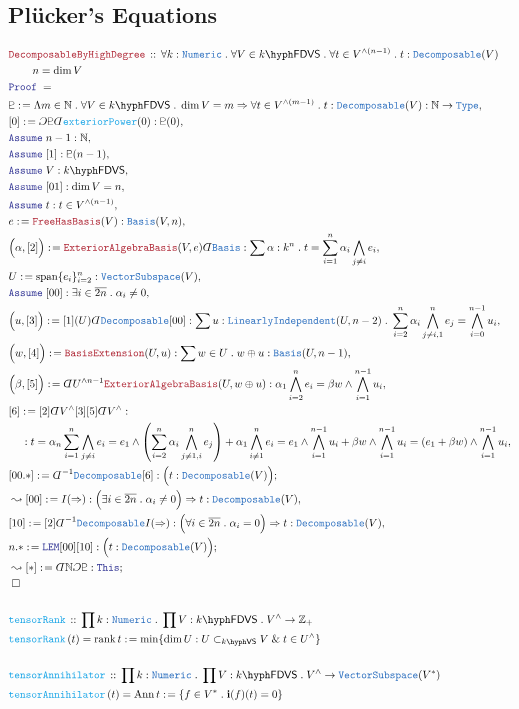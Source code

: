 \documentclass[12pt]{scrartcl}%
\newcommand{\TYPE}[1]{\textcolor{NavyBlue}{\mathtt{#1}}}%
\newcommand{\FUNC}[1]{\textcolor{Cerulean}{\mathtt{#1}}}%
\newcommand{\LOGIC}[1]{\textcolor{Blue}{\mathtt{#1}}}%
\newcommand{\THM}[1]{\textcolor{Maroon}{\mathtt{#1}}}%
\renewcommand{\.}{\; . \;} %
\newcommand{\de}{: \kern 0.1pc =} %
\newcommand{\Act}[1]{\left( #1 \right)} %
\newcommand{\Theorem}[2]{& \THM{#1} \, :: \, #2 \\ & \Proof = \\ } %
\newcommand{\DeclareFunc}[2]{& \FUNC{#1} \, :: \, #2 \\}%
\newcommand{\DefineNamedFunc}[4]{&  \FUNC{#1}\Act{#2} = #3 \de #4 \\}%
\newcommand{\NewLine}{\\ & \kern 1pc}%
\newcommand{\Page}[1]{ \begin{align*} #1 \end{align*}  }%
\newcommand{ \bd }{ \ByDef }%
\renewcommand{\And}{\; \& \;}%
\newcommand{\Type}{\TYPE{Type}}%
\newcommand{\Int}{\mathbb{Z}}%
\newcommand{\Nat}{\mathbb{N}}%
\newcommand{\Imply}{\Rightarrow}
\newcommand{\Say}[3]{& #1 \de #2 : #3, \\} %
\newcommand{\Conclude}[3]{& #1 \de #2 : #3; \\}%
\newcommand{\Derive}[3]{& \leadsto #1 \de #2 : #3, \\} %
\newcommand{\DeriveConclude}[3]{& \leadsto #1 \de #2 : #3 ; \\} %
\newcommand{\Assume}[2]{& \LOGIC{Assume} \; #1 : #2, \\} %
\newcommand{\QED}{\; \square} %
\newcommand{\EndProof}{& \QED \\} %
\newcommand{\ByDef}{\rotatebox[origin=c]{-180}{$D$}}%
\newcommand{\ByConstr}{\rotatebox[origin=c]{-180}{$C$}}%
\newcommand{\Proof}{\LOGIC{Proof} \; } %
\DeclareMathOperator{\rank}{rank} %
\newcommand{\Basis}{\TYPE{Basis}} %
\newcommand{\subvec}[1]{\subset_{\VS{#1}}}%
\newcommand{\LI}{\TYPE{LinearlyIndependent}}
\DeclareMathOperator{\Span}{span} %
\DeclareMathOperator{\Ann}{Ann}   %
\newcommand{\VS}[1]{#1\hyph\mathsf{VS}} %
\newcommand{\FDVS}[1]{#1\hyph\mathsf{FDVS}} %
\begin{document}
\subsection{Pl{\"u}cker's Equations}
\Page{
	\Theorem{DecomposableByHighDegree}
	{
		\forall k : \TYPE{Numeric} \.
		\forall V \in \FDVS{k} \.
		\forall t \in V^{\wedge(n-1)} \.
		t : \TYPE{Decomposable}(V)
		\NewLine
		\quad n = \dim V
	}
	\Say{\pluto}
	{
		\Lambda m \in \Nat \. 
		\forall V \in \FDVS{k} \.
		\dim V = m \Imply
		\forall t \in V^{\wedge(m-1)} \.
		t : \TYPE{Decomposable}(V)
	}
	{
		\Nat \to \Type
	}
	\Say{[0]}{\ByConstr \pluto \bd \FUNC{exteriorPower}(0)}
	{\pluto(0)}
	\Assume{n-1}{\Nat}
	\Assume{[1]}{\pluto(n-1)}
	\Assume{V}{\FDVS{k}}
	\Assume{[01]}{\dim V = n}
	\Assume{t}{t \in V^{\wedge(n-1)}}
	\Say{e}{\THM{FreeHasBasis}(V)}{\TYPE{Basis}(V,n)}
	\Say{\Big(\alpha,[2]\Big)}
	{
		\THM{ExteriorAlgebraBasis}(V,e)\bd \TYPE{Basis}                 
	}
	{
		\sum \alpha : k^n \.
		t = \sum_{i=1}^n \alpha_i\bigwedge_{j\neq i} e_i
	}
	\Say{U}{\Span \{ e_i\}_{i=2}^n}{\TYPE{VectorSubspace}(V)}
	\Assume{[00]}{\exists i \in \overline{2n} \. \alpha_i \neq 0}
	\Say{\Big( u,[3]\Big)}{[1](U)\bd \TYPE{Decomposable}[00]}
	{
		\sum u : \LI(U,n-2) \. 
		\sum^n_{i=2} \alpha_i\bigwedge^n_{j\neq i,1} e_j = 
		\bigwedge^{n-1}_{i=0} u_i
	}
	\Say{\Big(w,[4]\Big)}{\THM{BasisExtension}(U,u)}
	{
		\sum w \in U \. w \oplus u : \Basis(U,n-1)
	}
	\Say{\Big(\beta,[5] \Big)}{\bd U^{\wedge n-1}
		\THM{ExteriorAlgebraBasis}(U,w \oplus u)}
	{
		\alpha_1 \bigwedge^n_{i=2} e_i = 
		\beta w \wedge \bigwedge^{n-1}_{i=1} u_i 
	}
	\Say{[6]}{[2]\bd V^\wedge [3][5]\bd V^\wedge}
	{
		\NewLine :
		t = \alpha_n \sum^n_{i=1} \bigwedge_{j\neq i} e_i  = 
		e_1 \wedge \left( \sum^n_{i=2} \alpha_i \bigwedge^n_{j\neq 1,i}e_j
		\right)  + \alpha_1 \bigwedge^n_{i\neq 1} e_i =
		e_1 \wedge \bigwedge^{n-1}_{i=1} u_i 
		+
		\beta w \wedge \bigwedge^{n-1}_{i=1} u_i =
		(e_1 + \beta w) \wedge \bigwedge^{n-1}_{i=1} u_i  
	}
	\Conclude{[00.*]}{\bd^{-1}\TYPE{Decomposable}[6]}
	{
		\Big(
			t : \TYPE{Decomposable}(V)
		\Big)
	}
	\Derive{[00]}{I(\Imply)}{
		\Big(\exists i \in \overline{2n} \. 
		\alpha_i \neq 0 \Big)
		\Imply t  : \TYPE{Decomposable}(V)}
	\Say{[10]}{[2]\bd^{-1}\TYPE{Decomposable}I(\Imply)}
	{
		\Big(\forall i \in \overline{2n} \. \alpha_i = 0 \Big)
		\Imply
		t : \TYPE{Decomposable}(V)
	}
	\Conclude{n.*}{\LOGIC{LEM}[00][10]}
	{
		\Big(t : \TYPE{Decomposable}(V)\Big)
	}
	\DeriveConclude{[*]}{\bd \Nat \ByConstr \pluto }
	{
		\LOGIC{This}
	}
	\EndProof
	\\
	\DeclareFunc{tensorRank}
	{
		\prod k : \TYPE{Numeric} \.
		\prod V : \FDVS{k} \.
		V^{\wedge } \to \Int_+ 
	}
	\DefineNamedFunc{tensorRank}{t}{\rank t}{
		\min \{ \dim U : U \subvec{k} V \And t \in U^\wedge  \}}
	\\
	\DeclareFunc{tensorAnnihilator}
	{
		\prod k : \TYPE{Numeric} \.
		\prod V : \FDVS{k} \.
		V^{\wedge } \to \TYPE{VectorSubspace}(V^*)  
	}
	\DefineNamedFunc{tensorAnnihilator}{t}{\Ann t}
	{
		\{ f \in V^* \. \mathbf{i}(f)(t) = 0  \}
	}
}
\end{document}
